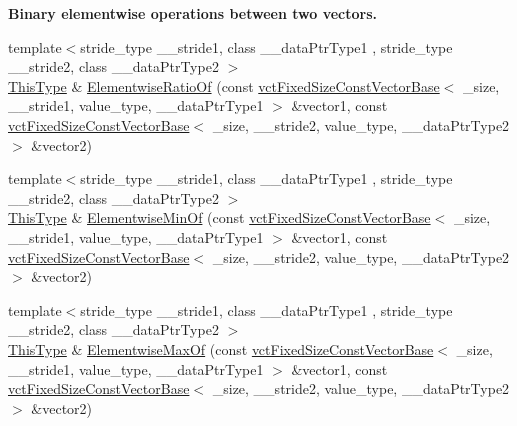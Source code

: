 \begin{Indent}{\bf Binary elementwise operations between two vectors.}
\begin{DoxyCompactItemize}
\item 
{\footnotesize template$<$stride\-\_\-type \-\_\-\-\_\-stride1, class \-\_\-\-\_\-data\-Ptr\-Type1 , stride\-\_\-type \-\_\-\-\_\-stride2, class \-\_\-\-\_\-data\-Ptr\-Type2 $>$ }\\\hyperlink{classvct_fixed_size_const_vector_base_a071063bc4fa43112cc287b2dbef53180}{This\-Type} \& \hyperlink{classvct_fixed_size_vector_base_ae9b3f8f5beb5abec1f56e4bb9e4ea083}{Elementwise\-Ratio\-Of} (const \hyperlink{classvct_fixed_size_const_vector_base}{vct\-Fixed\-Size\-Const\-Vector\-Base}$<$ \-\_\-size, \-\_\-\-\_\-stride1, value\-\_\-type, \-\_\-\-\_\-data\-Ptr\-Type1 $>$ \&vector1, const \hyperlink{classvct_fixed_size_const_vector_base}{vct\-Fixed\-Size\-Const\-Vector\-Base}$<$ \-\_\-size, \-\_\-\-\_\-stride2, value\-\_\-type, \-\_\-\-\_\-data\-Ptr\-Type2 $>$ \&vector2)
\item 
{\footnotesize template$<$stride\-\_\-type \-\_\-\-\_\-stride1, class \-\_\-\-\_\-data\-Ptr\-Type1 , stride\-\_\-type \-\_\-\-\_\-stride2, class \-\_\-\-\_\-data\-Ptr\-Type2 $>$ }\\\hyperlink{classvct_fixed_size_const_vector_base_a071063bc4fa43112cc287b2dbef53180}{This\-Type} \& \hyperlink{classvct_fixed_size_vector_base_a92bef8de3636c3608dff9449331de10d}{Elementwise\-Min\-Of} (const \hyperlink{classvct_fixed_size_const_vector_base}{vct\-Fixed\-Size\-Const\-Vector\-Base}$<$ \-\_\-size, \-\_\-\-\_\-stride1, value\-\_\-type, \-\_\-\-\_\-data\-Ptr\-Type1 $>$ \&vector1, const \hyperlink{classvct_fixed_size_const_vector_base}{vct\-Fixed\-Size\-Const\-Vector\-Base}$<$ \-\_\-size, \-\_\-\-\_\-stride2, value\-\_\-type, \-\_\-\-\_\-data\-Ptr\-Type2 $>$ \&vector2)
\item 
{\footnotesize template$<$stride\-\_\-type \-\_\-\-\_\-stride1, class \-\_\-\-\_\-data\-Ptr\-Type1 , stride\-\_\-type \-\_\-\-\_\-stride2, class \-\_\-\-\_\-data\-Ptr\-Type2 $>$ }\\\hyperlink{classvct_fixed_size_const_vector_base_a071063bc4fa43112cc287b2dbef53180}{This\-Type} \& \hyperlink{classvct_fixed_size_vector_base_a50b46b840249d9b88bd58330cf1d8186}{Elementwise\-Max\-Of} (const \hyperlink{classvct_fixed_size_const_vector_base}{vct\-Fixed\-Size\-Const\-Vector\-Base}$<$ \-\_\-size, \-\_\-\-\_\-stride1, value\-\_\-type, \-\_\-\-\_\-data\-Ptr\-Type1 $>$ \&vector1, const \hyperlink{classvct_fixed_size_const_vector_base}{vct\-Fixed\-Size\-Const\-Vector\-Base}$<$ \-\_\-size, \-\_\-\-\_\-stride2, value\-\_\-type, \-\_\-\-\_\-data\-Ptr\-Type2 $>$ \&vector2)
\item 

\end{DoxyCompactItemize}
\end{Indent}
